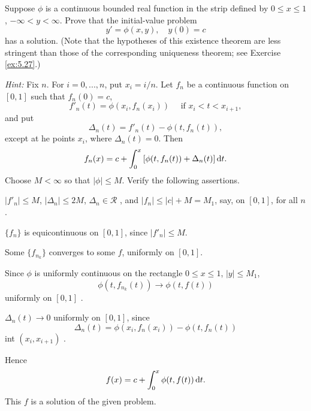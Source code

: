 \begin{myexercise}
    \label{ex:7.25}
    Suppose $\phi$ is a continuous bounded real function in the strip defined by $0 \leq x \leq 1$, $- \infty < y < \infty$. 
    Prove that the initial-value problem
    \begin{equation*}
        y' = \phi(x,y), \quad 
        y(0) = c
    \end{equation*}
    has a solution. 
    (Note that the hypotheses of this existence theorem are less stringent than those of the corresponding uniqueness theorem; see Exercise \ref{ex:5.27}.)

    \emph{Hint:} Fix $n$. For $i = 0, ... , n$, put $x_i = i/n$. Let $f_n$ be a continuous function on $[0, 1]$ such that $f_n(0) = c$,
    \begin{equation*}
        f'_n(t) = \phi(x_i, f_n(x_i)) \quad 
        \text{ if } 
        x_i < t < x_{i+1} ,
    \end{equation*}
    and put 
    \begin{equation*}
        \Delta_n(t) = f'_n(t) - \phi(t, f_n(t)),
    \end{equation*}
    except at he points $x_i$, where $\Delta_n(t) = 0$.
    Then 
    \begin{equation*}
        f_n(x) = c + \int_{0}^{x} \left[ \phi(t,f_n(t)) + \Delta_n(t) \right] \d t.
    \end{equation*}
    Choose $M < \infty$ so that $|\phi| \leq M$.
    Verify the following assertions.
    \begin{asparaenum}[(a)]
        \item $|f'_n| \leq M$, $|\Delta_n| \leq 2M$, $\Delta_n \in \mathscr{R}$ , and $|f_n| \leq |c| + M = M_1$, say, on $[0,1]$, for all $n$.
        \item $\{f_n\}$ is equicontinuous on $[0,1]$, since $|f'_n| \leq M$.
        \item Some $\{f_{n_k}\}$ converges to some $f$, uniformly on $[0,1]$.
        \item Since $\phi$ is uniformly continuous on the rectangle $0 \leq x \leq 1$, $|y| \leq M_1$,
        \begin{equation*}
            \phi(t,f_{n_k}(t)) \rightarrow
            \phi(t,f(t)) 
        \end{equation*}
        uniformly on $[0,1]$ .
        \item $\Delta_n(t) \rightarrow 0$ uniformly on $[0,1]$, since
        \begin{equation*}
            \Delta_n(t) = \phi(x_i,f_{n}(x_i)) - \phi(t,f_{n}(t))
        \end{equation*}
        int $(x_i, x_{i+1})$ .
        \item Hence 
        \begin{equation*}
            f(x) = c + \int_{0}^{x} \phi (t, f(t)) \d t .
        \end{equation*}
        This $f$ is a solution of the given problem.
    \end{asparaenum}
\end{myexercise}


